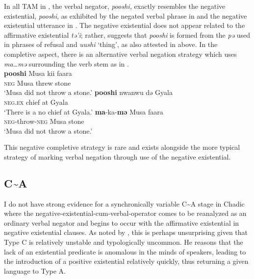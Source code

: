 \documentclass[output=paper]{langsci/langscibook}
\begin{document}
In all TAM in , the verbal negator, \textit{pooshi,} exactly
resembles the negative existential, \textit{pooshi}, as exhibited by the
negated verbal phrase in  and the negative existential
utterance in .  The negative existential does not appear
related to the affirmative existential \textit{tə'i}; rather,
\citet{Hoskison1983} suggests that \textit{pooshi} is formed from the
\textit{pə} used in phrases of refusal and \textit{uushi} `thing', as also
attested in  above. In the completive aspect, there is an
alternative verbal negation strategy which uses \textit{ma{\ldots}mə}
surrounding the verb stem as in .
\ea\label{ex:gude-stone-chief-Musa} \\ 
\ea\label{ex:gude-stone} \gll \textbf{pooshi} Musa kii
faara\\ \textsc{neg} Musa threw stone\\ \glt `Musa did not throw a stone.'
\ex\label{ex:gude-chief} \gll \textbf{pooshi} nwanwu də Gyala\\
\textsc{neg.ex} chief at Gyala\\ \glt `There is a no chief at Gyala.' 
\ex\label{ex:gude-Musa}
\gll \textbf{ma}-ka-\textbf{mə} Musa faara\\
\textsc{neg}-throw-\textsc{neg} Musa stone\\
\glt `Musa did not throw a stone.'
\z\z

This negative completive strategy is rare and exists alongside the more typical strategy of marking verbal negation through use of the negative existential. 

\subsection{C{\textasciitilde}A}\label{sec:3:3.6}

I do not have strong evidence for a synchronically variable C{\textasciitilde}A stage in Chadic where the negative-existential-cum-verbal-operator comes to be reanalyzed as an ordinary verbal negator and begins to occur with the affirmative existential in negative existential clauses. As noted by \citet[19]{Croft1991}, this is perhaps unsurprising given that Type C is relatively unstable and typologically uncommon. He reasons that the lack of an existential predicate is anomalous in the minds of speakers, leading to the introduction of a positive existential relatively quickly, thus returning a given language to Type A. 
\end{document}
